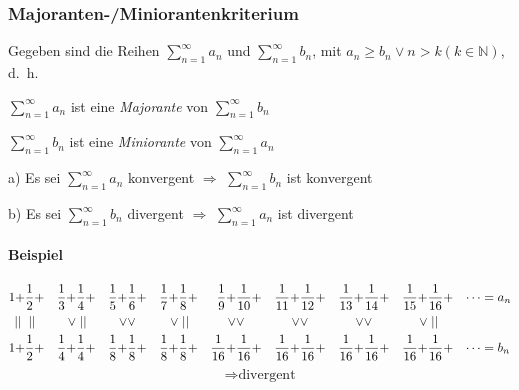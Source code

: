 \subsubsection{Majoranten-/Miniorantenkriterium}

Gegeben sind die Reihen \( \sum\limits^{\infty}_{n=1} a_n \) und  \( \sum\limits^{\infty}_{n=1} b_n \), mit \( a_n \geq b_n \vee n > k (k \in \mathbb{N}) \), d.~h.

\begin{gesetz}
	\begin{center}

		\( \sum\limits^{\infty}_{n=1} a_n \) ist eine \textit{Majorante} von \( \sum\limits^{\infty}_{n=1} b_n \)


		\medskip

		\( \sum\limits^{\infty}_{n=1} b_n \) ist eine \textit{Miniorante} von \( \sum\limits^{\infty}_{n=1} a_n \)

		\bigskip

		a) Es sei \( \sum\limits^{\infty}_{n=1} a_n \) konvergent \(\Rightarrow\) \( \sum\limits^{\infty}_{n=1} b_n \) ist konvergent

		\medskip

		b) Es sei \( \sum\limits^{\infty}_{n=1} b_n \) divergent \(\Rightarrow\) \( \sum\limits^{\infty}_{n=1} a_n \) ist divergent

	\end{center}
\end{gesetz}

\paragraph{Beispiel}

\begin{align*}
	1 +     & \frac{1}{2} + & \frac{1}{3} + & \frac{1}{4} + & \frac{1}{5} + & \frac{1}{6} + & \frac{1}{7} + & \frac{1}{8} + & \frac{1}{9} +  & \frac{1}{10} + & \frac{1}{11} + & \frac{1}{12} + & \frac{1}{13} + & \frac{1}{14} + & \frac{1}{15} + & \frac{1}{16} + & \cdots & = a_n \\
	\mid\mid{} & \mid\mid{}       & \vee          & \mid\mid{}       & \vee          & \vee          & \vee          & \mid\mid{}       & \vee           & \vee           & \vee           & \vee           & \vee           & \vee           & \vee           & \mid\mid{}        &        &       \\
	1 +     & \frac{1}{2} + & \frac{1}{4} + & \frac{1}{4} + & \frac{1}{8} + & \frac{1}{8} + & \frac{1}{8} + & \frac{1}{8} + & \frac{1}{16} + & \frac{1}{16} + & \frac{1}{16} + & \frac{1}{16} + & \frac{1}{16} + & \frac{1}{16} + & \frac{1}{16} + & \frac{1}{16} + & \cdots & = b_n \\
\end{align*}
\[
	\Rightarrow \text{divergent}
\]

